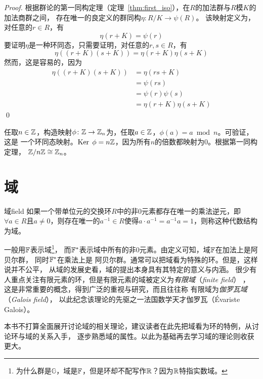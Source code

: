 \begin{proof}
根据群论的第一同构定理（定理~\ref{thm:first_iso}），在$R$的加法群与$R$模$K$的加法商群之间，
存在唯一的良定义的群同构$\eta\colon R/K \to \psi(R)$。
该映射定义为，对任意的$r \in R$，有
\[\eta(r + K) = \psi(r)\]
要证明$\eta$是一种环同态，只需要证明，对任意的$r, s \in R$，有
\[\eta((r+K)(s+K))= \eta(r+K)\eta(s+K)\]
然而，这是容易的，因为
\begin{align*}
\eta((r+K)(s+K)) &= \eta(rs + K)\\
                                  &= \psi(rs)\\
                                  &= \psi(r)\psi(s)\\
                                  &= \eta(r+K)\eta(s+K)                                  
\end{align*}
\qed
\end{proof}

\begin{example}
\label{exm:Zn_mod_nZ}
任取$n \in {\mathbb Z}$，构造映射$\phi\colon {\mathbb Z} \to {\mathbb Z}_n$为，任取$a \in {\mathbb Z}$，$\phi(a) = a \bmod n$。可验证，这是
一个环同态映射。$\operatorname{Ker}\; \phi = n {\mathbb Z}$，因为所有$n$的倍数都映射为$0$。根据第一同构定理，
${\mathbb Z} / n {\mathbb Z} \cong {\mathbb Z}_n$。
\end{example}

\section{域}
\label{sec:field}
\begin{definition}{域}{field}
如果一个带单位元的交换环$R$中的非$0$元素都存在唯一的乘法逆元，即
$\forall a \in R$且$a \neq 0$，则存在唯一的$a^{-1}\in R$使得$a \cdot a^{-1} = a^{-1}a =1$，则称这种代数结构
为域。
\end{definition}
一般用${\mathbb F}$表示域\footnote{为什么群是$\mathbb{G}$，域是${\mathbb F}$，但是环却不配写作${\mathbb R}$？因为${\mathbb R}$特指实数域。}，
而${\mathbb F}^*$表示域中所有的非$0$元素。由定义可知，域${\mathbb F}$在加法上是阿贝尔群，
同时${\mathbb F}^*$在乘法上是
阿贝尔群。通常可以把域看为特殊的环。但是，这样说并不公平，
从域的发展史看，域的提出本身具有其特定的意义与内涵。
很少有人重点关注有限元素的环，但是有限元素的域被定义为\emph{有限域}（\emph{finite field}）
，
这是非常重要的概念，得到广泛的重视与研究，而且往往称
有限域为\emph{伽罗瓦域}（\emph{Galois field}），
以此纪念该理论的先驱之一法国数学天才伽罗瓦（\'{E}variste Galois）。

本书不打算全面展开讨论域的相关理论，建议读者在此先把域看为环的特例，从讨论环与域的关系入手，
逐步熟悉域的属性。以此为基础再去学习域的理论则收获更大。

